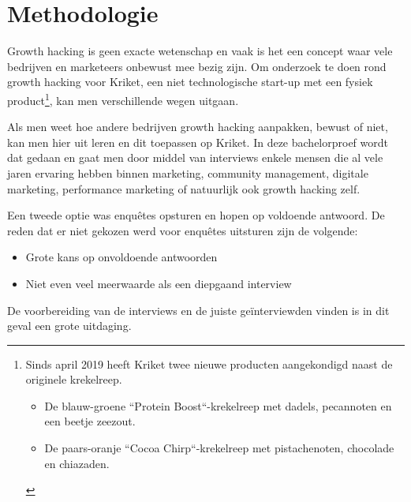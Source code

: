 
\chapter{Methodologie}
\label{ch:methodologie}


Growth hacking is geen exacte wetenschap en vaak is het een concept waar vele bedrijven en marketeers onbewust mee bezig zijn. Om onderzoek te doen rond growth hacking voor Kriket, een niet technologische start-up met een fysiek product\footnote{Sinds april 2019 heeft Kriket twee nieuwe producten aangekondigd naast de originele krekelreep. 
\begin{itemize}       
	\item De blauw-groene ``Protein Boost``-krekelreep met dadels, pecannoten en een beetje zeezout. 
	\item De paars-oranje ``Cocoa Chirp``-krekelreep met pistachenoten, chocolade en chiazaden.
\end{itemize}
}, kan men verschillende wegen uitgaan. 

Als men weet hoe andere bedrijven growth hacking aanpakken, bewust of niet, kan men hier uit leren en dit toepassen op Kriket. In deze bachelorproef wordt dat gedaan en gaat men door middel van interviews enkele mensen die al vele jaren ervaring hebben binnen marketing, community management, digitale marketing, performance marketing of natuurlijk ook growth hacking zelf. 

Een tweede optie was enquêtes opsturen en hopen op voldoende antwoord. De reden dat er niet gekozen werd voor enquêtes uitsturen zijn de volgende:
\begin{itemize} 
	\item Grote kans op onvoldoende antwoorden
	\item Niet even veel meerwaarde als een diepgaand interview
\end{itemize}

De voorbereiding van de interviews en de juiste geïnterviewden vinden is in dit geval een grote uitdaging. 

